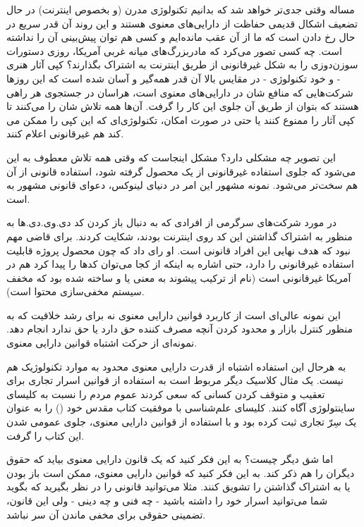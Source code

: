 مساله وقتی جدی‌تر خواهد شد که بدانیم تکنولوژی مدرن (و بخصوص اینترنت) در
حال تضعیف اشکال قدیمی حفاظت از دارایی‌های معنوی هستند و این روند آن قدر
سریع در حال رخ دادن است که ما از آن عقب مانده‌ایم و کسی هم توان پیش‌بینی
آن را نداشته است. چه کسی تصور می‌کرد که مادربزرگ‌های میانه غربی آمریکا،
روزی دستورات سوزن‌دوزی را به شکل غیرقانونی از طریق اینترنت به اشتراک
بگذارند؟ کپی آثار هنری - و خود تکنولوژی - در مقایس بالا آن قدر همه‌گیر
و آسان شده است که این روزها شرکت‌هایی که منافع شان در دارایی‌های معنوی
است، هراسان در جستجوی هر راهی هستند که بتوان از طریق آن جلوی این کار
را گرفت. آن‌ها همه تلاش شان را می‌کنند تا کپی آثار را ممنوع کنند یا حتی
در صورت امکان، تکنولوژی‌ای که این کپی را ممکن می کند هم غیرقانونی اعلام
کنند.

این تصویر چه مشکلی دارد؟ مشکل اینجاست که وقتی همه تلاش معطوف به این
می‌شود که جلوی استفاده غیرقانونی از یک محصول گرفته شود، استفاده قانونی
از آن‌ هم سخت‌تر می‌شود. نمونه مشهور این امر در دنیای لینوکس، دعوای
قانونی مشهور به  است.

در مورد  شرکت‌های سرگرمی از افرادی که به دنبال باز کردن کد
دی.وی.دی.ها به منظور به اشتراک گذاشتن این کد روی اینترنت بودند، شکایت
کردند. برای قاضی مهم نبود که هدف نهایی این افراد قانونی است. او رای
داد که چون محصول پروژه قابلیت استفاده غیرقانونی را دارد، حتی اشاره به
اینکه از کجا می‌توان کدها را پیدا کرد هم در آمریکا غیرقانونی است (نام
 از ترکیب پیشوند  به معنی  یا
 و  ساخته شده بود که مخفف سیستم مخفی‌سازی
محتوا است).

این نمونه عالی‌ای است از کاربرد قوانین دارایی معنوی نه برای رشد خلاقیت
که به منظور کنترل بازار و محدود کردن آنچه مصرف کننده حق دارد یا حق
ندارد انجام دهد. نمونه‌ای از حرکت اشتباه قوانین دارایی معنوی.

به هرحال این استفاده اشتباه از قدرت دارایی معنوی محدود به موارد
تکنولوژیک هم نیست. یک مثال کلاسیک دیگر مربوط است به استفاده از قوانین
اسرار تجاری برای تعقیب و متوقف کردن کسانی که سعی کردند عموم مردم را
نسبت به کلیسای ساینتولوژی آگاه کنند. کلیسای علم‌شناسی با موفقیت کتاب مقدس خود
() را به عنوان یک سِرّ تجاری ثبت کرده بود و با
استفاده از قوانین دارایی معنوی، جلوی عمومی شدن این کتاب را گرفت.

اما شق دیگر چیست؟ به این فکر کنید که یک قانون دارایی معنوی بیاید که
حقوق دیگران را هم ذکر کند. به این فکر کنید که قوانین دارایی معنوی،
ممکن است باز بودن یا به اشتراک گذاشتن را تشویق کنند. مثلا می‌توانید
قانونی را در نظر بگیرید که بگوید شما می‌توانید اسرار خود را داشته باشید
- چه فنی و چه دینی - ولی این قانون، تضمینی حقوقی برای مخفی ماندن آن سر
نباشد.

